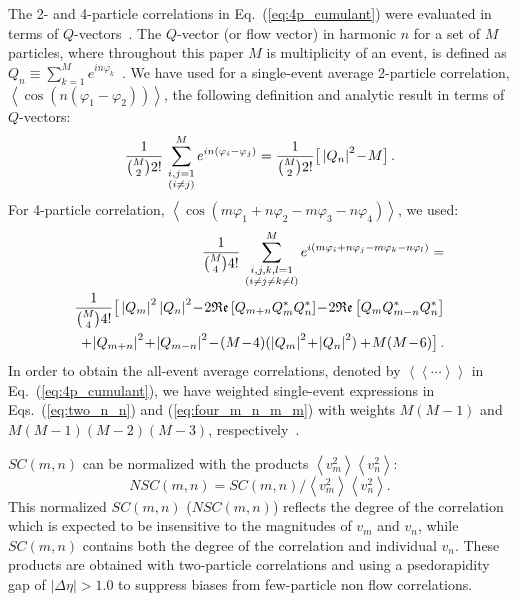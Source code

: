 The 2- and 4-particle correlations in Eq.~(\ref{eq:4p_cumulant}) were evaluated in terms of $Q$-vectors~\cite{Bilandzic:2010jr}. The $Q$-vector (or flow vector) in harmonic $n$ for a set of $M$ particles, where throughout this paper $M$ is multiplicity of an event, is defined as $Q_n\equiv\sum_{k=1}^Me^{in\varphi_k}$~\cite{Voloshin:1994mz,Barrette:1994xr}. We have used for a single-event average 2-particle correlation, $\left<\cos(n(\varphi_1\!-\!\varphi_2))\right>$, the following definition and analytic result in terms of $Q$-vectors:
%
\begin{equation}
\frac{1}{\binom{M}{2}2!}\,\sum_{\begin{subarray}{c}i,j=1\\ (i\neq j)\end{subarray}}^{M} e^{in(\varphi_i-\varphi_j)}
=\frac{1}{\binom{M}{2}2!}
\big[\left|Q_{n}\right|^2\!-\!M\big]\,.
\label{eq:two_n_n}
\end{equation}
%
For 4-particle correlation, $\left<\cos(m\varphi_1\!+\!n\varphi_2\!-\!m\varphi_3-\!n\varphi_4)\right>$, we used:
%
\begin{eqnarray}
&&\!\!\!\!\!\! \frac{1}{\binom{M}{4}4!}\,\sum_{\begin{subarray}{c}i,j,k,l=1\\ (i\neq j\neq k\neq l)\end{subarray}}^{M} e^{i(m\varphi_i+n\varphi_j-m\varphi_k-n\varphi_l)} = \nonumber\\
&&\!\!\!\!\!\!\frac{1}{\binom{M}{4}4!}\big[\left|Q_{m}\right|^2\left|Q_{n}\right|^2\!-\!
2\mathfrak{Re}\left[Q_{m+n}Q_{m}^*Q_{n}^*\right]\!-\!
2\mathfrak{Re}\left[Q_{m}Q_{m-n}^*Q_{n}^*\right]\nonumber\\
&&{}\!\!\!\!\!\!\!+\!\left|Q_{m+n}\right|^2\!+\!\left|Q_{m-n}\right|^2\!-\!(M\!-\!4)(\left|Q_{m}\right|^2\!+\!\left|Q_{n}\right|^2)
+\!M(M\!-\!6)\big]\,.
\label{eq:four_m_n_m_m}
\end{eqnarray}
%
\noindent In order to obtain the all-event average correlations, denoted by $\left<\left<\cdots\right>\right>$ in Eq.~(\ref{eq:4p_cumulant}), we have weighted single-event expressions in Eqs.~(\ref{eq:two_n_n}) and (\ref{eq:four_m_n_m_m}) with weights $M(M\!-\!1)$ and $M(M\!-\!1)(M\!-\!2)(M\!-\!3)$, respectively~\cite{Bilandzic:2012wva}.

$SC(m,n)$ can be normalized with the products  $\left<v_{m}^2\right>\left<v_{n}^2\right>$:
\begin{equation}
NSC(m,n) = SC(m,n) / \left<v_{m}^2\right>\left<v_{n}^2\right>.
\label{eq:nsc}
\end{equation}
This normalized $SC(m,n)$ ($NSC(m,n)$) reflects  the degree of the correlation which is expected to be insensitive to the magnitudes of $v_{m}$ and $v_{n}$, while $SC(m,n)$ contains both the degree of the correlation and individual $v_{n}$.
These products are obtained with two-particle correlations and using a psedorapidity gap of $|\Delta\eta|>1.0$ to suppress biases from few-particle non flow correlations.


